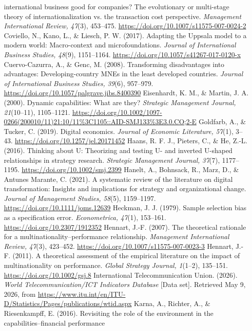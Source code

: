 \documentclass[12pt,a4paper]{article}
\begin{document}
international business good for companies? The evolutionary or
multi-stage theory of internationalization vs. the transaction cost
perspective. \emph{Management International Review, 47}(3), 453--475.
\url{https://doi.org/10.1007/s11575-007-0024-2} Coviello, N., Kano, L.,
\& Liesch, P. W. (2017). Adapting the Uppsala model to a modern world:
Macro-context and microfoundations. \emph{Journal of International
Business Studies, 48}(9), 1151--1164.
\url{https://doi.org/10.1057/s41267-017-0120-x} Cuervo-Cazurra, A., \&
Genc, M. (2008). Transforming disadvantages into advantages:
Developing-country MNEs in the least developed countries. \emph{Journal
of International Business Studies, 39}(6), 957--979.
\url{https://doi.org/10.1057/palgrave.jibs.8400390} Eisenhardt, K. M.,
\& Martin, J. A. (2000). Dynamic capabilities: What are they?
\emph{Strategic Management Journal, 21}(10--11), 1105--1121.
\url{https://doi.org/10.1002/1097-0266(200010/11)21:10/11\%3C1105::AID-SMJ133\%3E3.0.CO;2-E}
Goldfarb, A., \& Tucker, C. (2019). Digital economics. \emph{Journal of
Economic Literature, 57}(1), 3--43.
\url{https://doi.org/10.1257/jel.20171452} Haans, R. F. J., Pieters, C.,
\& He, Z.-L. (2016). Thinking about U: Theorizing and testing U- and
inverted U-shaped relationships in strategy research. \emph{Strategic
Management Journal, 37}(7), 1177--1195.
\url{https://doi.org/10.1002/smj.2399} Hanelt, A., Bohnsack, R., Marz,
D., \& Antunes Marante, C. (2021). A systematic review of the literature
on digital transformation: Insights and implications for strategy and
organizational change. \emph{Journal of Management Studies, 58}(5),
1159--1197. \url{https://doi.org/10.1111/joms.12639} Heckman, J. J.
(1979). Sample selection bias as a specification error.
\emph{Econometrica, 47}(1), 153--161.
\url{https://doi.org/10.2307/1912352} Hennart, J.-F. (2007). The
theoretical rationale for a multinationality--performance relationship.
\emph{Management International Review, 47}(3), 423--452.
\url{https://doi.org/10.1007/s11575-007-0023-3} Hennart, J.-F. (2011). A
theoretical assessment of the empirical literature on the impact of
multinationality on performance. \emph{Global Strategy Journal,
1}(1--2), 135--151. \url{https://doi.org/10.1002/gsj.8} International
Telecommunication Union. (2026). \emph{World Telecommunication/ICT
Indicators Database} {[}Data set{]}. Retrieved May 9, 2026, from
\url{https://www.itu.int/en/ITU-D/Statistics/Pages/publications/wtid.aspx}
Karna, A., Richter, A., \& Riesenkampff, E. (2016). Revisiting the role
of the environment in the capabilities--financial performance
\end{document}

